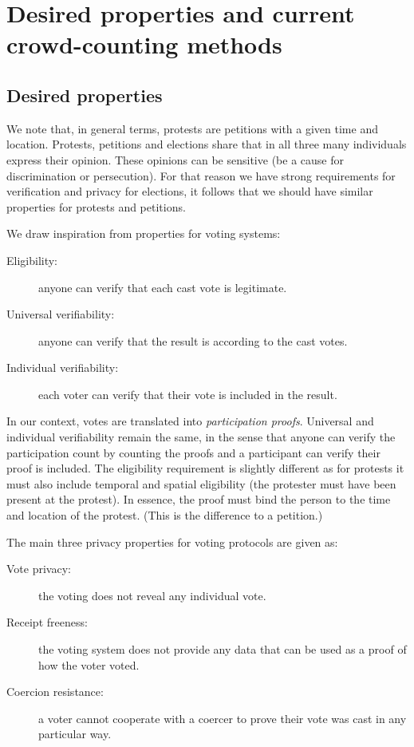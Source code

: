 \section{Desired properties and current crowd-counting methods}%
\label{current-crowd-counting}

\subsection{Desired properties}%
\label{desired-properties}

We note that, in general terms, protests are petitions with a given time and 
location.
Protests, petitions and elections share that in all three many individuals 
express their opinion.
These opinions can be sensitive (\eg be a cause for discrimination or 
persecution).
For that reason we have strong requirements for verification and privacy for 
elections, it follows that we should have similar properties for protests
and petitions.

We draw inspiration from properties for voting systems:
\begin{description}
  \item[Eligibility:] anyone can verify that each cast vote is legitimate.
  \item[Universal verifiability:] anyone can verify that the result is according to the cast votes.
  \item[Individual verifiability:] each voter can verify that their vote is 
    included in the result.
\end{description}
In our context, votes are translated into \emph{participation proofs}.
Universal and individual verifiability remain the same, in the sense that anyone can verify the participation count by counting the proofs and a participant can verify their proof is included.
The eligibility requirement is slightly different as for protests it must also
include temporal %
and spatial eligibility (\ie the protester must have been present at the 
protest).
In essence, the proof must bind the person to the time and location of the protest.
(This is the difference to a petition.)

The main three privacy properties for voting protocols are given as:
\begin{description}
  \item[Vote privacy:] the voting does not reveal any individual vote.
  \item[Receipt freeness:] the voting system does not provide any data that can be used as a proof of how the voter voted.
  \item[Coercion resistance:] a voter cannot cooperate with a coercer to prove their vote was cast in any particular way.
\end{description}

